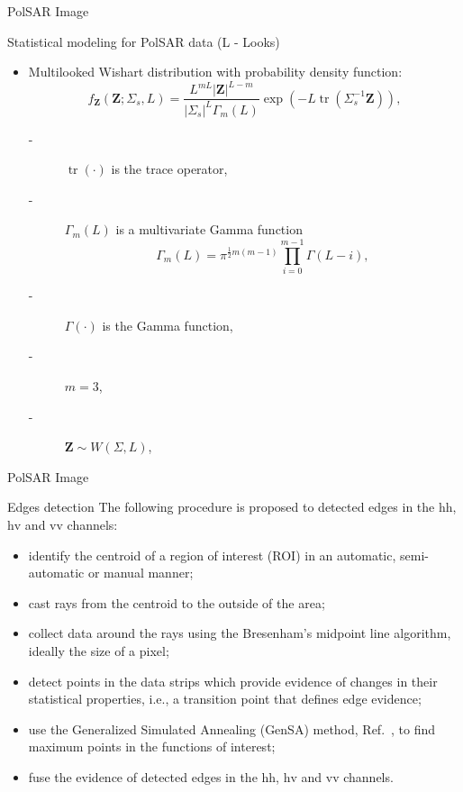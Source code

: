 \documentclass[10pt]{beamer}
\DeclareMathOperator{\traco}{tr} %
\begin{document}
\begin{frame}[fragile]{PolSAR Image}
\begin{alertblock}{Statistical modeling for PolSAR data (L - Looks)}
\begin{itemize}
\item Multilooked Wishart distribution with probability density function:
\begin{equation}
    f_{\mathbf{Z}}(\mathbf{Z};\Sigma_{s},L)=\frac{L^{mL}|\mathbf{Z}|^{L-m}}{|\Sigma_{s}|^{L}\Gamma_m(L)} \exp(-L\traco(\Sigma_{s}^{-1}\mathbf{Z})),
    \label{eq_04}
\end{equation} 
\begin{description}
\item[-] $\traco(\cdot)$ is the trace operator,
\item[-] $\Gamma_m(L)$ is a multivariate Gamma function
\begin{equation*}
	\Gamma_m(L)=\pi^{\frac{1}{2}m(m-1)} \prod_{i=0}^{m-1}\Gamma(L-i),
\end{equation*}
\item[-]$\Gamma(\cdot)$ is the Gamma function,
\item[-]$m=3$,
\item[-]$\mathbf{Z}\sim W(\Sigma, L)$, 
\end{description} 
\end{itemize}
\end{alertblock}
\end{frame}

\begin{frame}[fragile]{PolSAR Image}
\begin{alertblock}{Edges detection}
The following procedure is proposed to detected edges in the $\text{hh}$, $\text{hv}$ and $\text{vv}$ channels:
\begin{itemize}
	\item identify the centroid of a region of interest (ROI) in an automatic, semi-automatic or manual manner;
	\item cast rays from the centroid to the outside of the area;
	\item collect data around the rays using the  Bresenham's midpoint line algorithm, ideally the size of a pixel;
	\item detect points in the data strips which provide evidence of changes in their statistical properties, i.e., a transition point that defines edge evidence;
	\item use the Generalized Simulated Annealing (GenSA) method, Ref.~\cite{xgsh}, to find maximum points in the functions of interest;
	\item fuse the evidence of detected edges in the $\text{hh}$, $\text{hv}$ and $\text{vv}$ channels.
\end{itemize}
\end{alertblock}
\end{frame}
\end{document}
